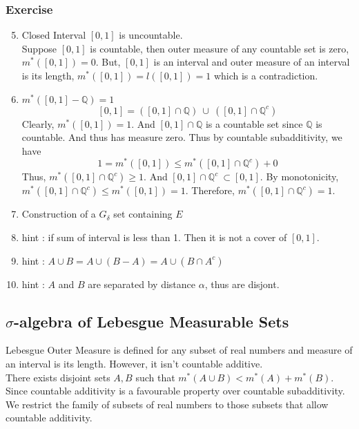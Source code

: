 \subsubsection{Exercise}
\begin{enumerate}
	\setcounter{enumi}{4}
\item Closed Interval $[0,1]$ is uncountable.\\
	Suppose $[0,1]$ is countable, then outer measure of any countable set is zero, $m^\ast([0,1]) = 0$.
		But, $[0,1]$ is an interval and outer measure of an interval is its length, $m^\ast([0,1]) = l([0,1]) = 1$ which is a contradiction.
\item $m^\ast([0,1] - \mathbb{Q}) = 1$
	$$[0,1] = \left( [0,1] \cap \mathbb{Q} \right)\ \cup\ \left( [0,1]\cap \mathbb{Q}^c \right)$$
	Clearly, $m^\ast([0,1]) = 1$.
		And $[0,1] \cap \mathbb{Q}$ is a countable set since $\mathbb{Q}$ is countable.
		And thus has measure zero.
		Thus by countable subadditivity, we have
	$$1 = m^\ast([0,1]) \le m^\ast([0,1] \cap \mathbb{Q}^c) + 0$$
		Thus, $m^\ast([0,1] \cap \mathbb{Q}^c) \ge 1$.
		And $[0,1] \cap \mathbb{Q}^c\ \subset [0,1]$.
		By monotonicity, $m^\ast([0,1] \cap \mathbb{Q}^c) \le m^\ast([0,1]) = 1$.
		Therefore, $m^\ast([0,1] \cap \mathbb{Q}^c) = 1$.
	\item Construction of a $G_\delta$ set containing $E$ %
	\item hint : if sum of interval is less than 1.
		Then it is not a cover of $[0,1]$.
	\item hint : $A \cup B = A \cup (B-A) = A \cup (B \cap A^c)$
	\item hint : $A$ and $B$ are separated by distance $\alpha$, thus are disjont.
\end{enumerate}

\subsection{$\sigma$-algebra of Lebesgue Measurable Sets}
	Lebesgue Outer Measure is defined for any subset of real numbers and measure of an interval is its length.
	However, it isn't countable additive.\\


	There exists disjoint sets $A,B$ such that $m^\ast(A\cup B) < m^\ast(A)+m^\ast(B)$.\\
	
	Since countable additivity is a favourable property over countable subadditivity.
	We restrict the family of subsets of real numbers to those subsets that allow countable additivity.
	
